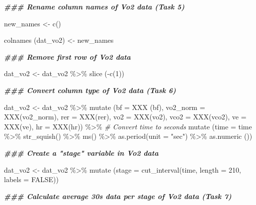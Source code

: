\documentclass[
]{book}
\newenvironment{Shaded}{\begin{snugshade}}{\end{snugshade}}
\newcommand{\AttributeTok}[1]{\textcolor[rgb]{0.77,0.63,0.00}{#1}}
\newcommand{\CommentTok}[1]{\textcolor[rgb]{0.56,0.35,0.01}{\textit{#1}}}
\newcommand{\ConstantTok}[1]{\textcolor[rgb]{0.00,0.00,0.00}{#1}}
\newcommand{\DecValTok}[1]{\textcolor[rgb]{0.00,0.00,0.81}{#1}}
\newcommand{\DocumentationTok}[1]{\textcolor[rgb]{0.56,0.35,0.01}{\textbf{\textit{#1}}}}
\newcommand{\FunctionTok}[1]{\textcolor[rgb]{0.00,0.00,0.00}{#1}}
\newcommand{\NormalTok}[1]{#1}
\newcommand{\OtherTok}[1]{\textcolor[rgb]{0.56,0.35,0.01}{#1}}
\newcommand{\SpecialCharTok}[1]{\textcolor[rgb]{0.00,0.00,0.00}{#1}}
\newcommand{\StringTok}[1]{\textcolor[rgb]{0.31,0.60,0.02}{#1}}
\begin{document}
\begin{Shaded}
\begin{Highlighting}[]
\DocumentationTok{\#\#\# Rename column names of Vo2 data (Task 5)}

\NormalTok{new\_names }\OtherTok{\textless{}{-}} \FunctionTok{c}\NormalTok{()}

\FunctionTok{colnames}\NormalTok{ (dat\_vo2)  }\OtherTok{\textless{}{-}}\NormalTok{ new\_names}

\DocumentationTok{\#\#\# Remove first row of Vo2 data}

\NormalTok{dat\_vo2 }\OtherTok{\textless{}{-}}\NormalTok{ dat\_vo2 }\SpecialCharTok{\%\textgreater{}\%} 
  \FunctionTok{slice}\NormalTok{ (}\SpecialCharTok{{-}}\FunctionTok{c}\NormalTok{(}\DecValTok{1}\NormalTok{))}

\DocumentationTok{\#\#\# Convert column type of Vo2 data (Task 6)}

\NormalTok{dat\_vo2 }\OtherTok{\textless{}{-}}\NormalTok{  dat\_vo2 }\SpecialCharTok{\%\textgreater{}\%}
  \FunctionTok{mutate}\NormalTok{ (}\AttributeTok{bf =} \FunctionTok{XXX}\NormalTok{ (bf),}
          \AttributeTok{vo2\_norm =} \FunctionTok{XXX}\NormalTok{(vo2\_norm),}
          \AttributeTok{rer =} \FunctionTok{XXX}\NormalTok{(rer),}
          \AttributeTok{vo2 =} \FunctionTok{XXX}\NormalTok{(vo2),}
          \AttributeTok{vco2 =} \FunctionTok{XXX}\NormalTok{(vco2),}
          \AttributeTok{ve =} \FunctionTok{XXX}\NormalTok{(ve),}
          \AttributeTok{hr =} \FunctionTok{XXX}\NormalTok{(hr)) }\SpecialCharTok{\%\textgreater{}\%}
  \CommentTok{\# Convert time to seconds}
  \FunctionTok{mutate}\NormalTok{ (}\AttributeTok{time =}\NormalTok{ time }\SpecialCharTok{\%\textgreater{}\%} 
            \FunctionTok{str\_squish}\NormalTok{() }\SpecialCharTok{\%\textgreater{}\%} 
            \FunctionTok{ms}\NormalTok{() }\SpecialCharTok{\%\textgreater{}\%} 
            \FunctionTok{as.period}\NormalTok{(}\AttributeTok{unit =} \StringTok{"sec"}\NormalTok{) }\SpecialCharTok{\%\textgreater{}\%} 
            \FunctionTok{as.numeric}\NormalTok{ ()) }

\DocumentationTok{\#\#\# Create a "stage" variable in Vo2 data}

\NormalTok{dat\_vo2 }\OtherTok{\textless{}{-}}\NormalTok{ dat\_vo2 }\SpecialCharTok{\%\textgreater{}\%}
  \FunctionTok{mutate}\NormalTok{ (}\AttributeTok{stage =} \FunctionTok{cut\_interval}\NormalTok{(time, }\AttributeTok{length =} \DecValTok{210}\NormalTok{, }\AttributeTok{labels =} \ConstantTok{FALSE}\NormalTok{))}

\DocumentationTok{\#\#\# Calculate average 30s data per stage of Vo2 data (Task 7)}


\end{Highlighting}
\end{Shaded}
\end{document}
